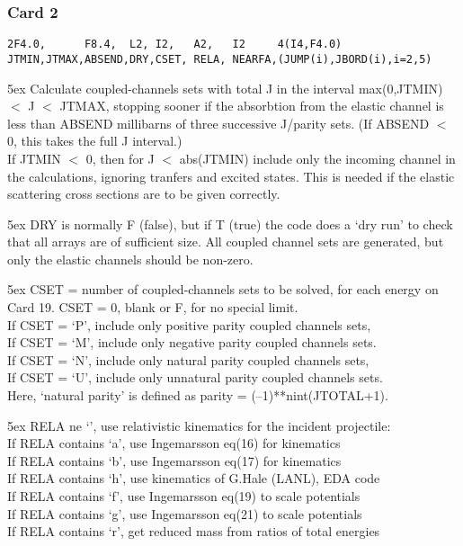 \documentclass[11pt]{article}
\begin{document}
\subsubsection*{Card 2}
\begin{verbatim}
2F4.0,      F8.4,  L2, I2,   A2,   I2     4(I4,F4.0)
JTMIN,JTMAX,ABSEND,DRY,CSET, RELA, NEARFA,(JUMP(i),JBORD(i),i=2,5)
\end{verbatim}



\hangindent 5ex
Calculate coupled-channels sets with total J in the interval
max(0,JTMIN) $<$  J  $<$ JTMAX,
stopping sooner if the absorbtion from the elastic channel
is less than ABSEND millibarns of three successive J/parity sets.
(If ABSEND $<$ 0, this takes the full J interval.)
\\
If JTMIN $<$ 0, then for J $<$ abs(JTMIN) include only the incoming channel
in the calculations, ignoring tranfers and excited states.
This is needed if the elastic scattering cross sections are to be given
correctly.

\hangindent 5ex
DRY is normally F (false), but if T (true) the code does a `dry run'
to check that all arrays are of sufficient size.
All coupled channel sets are generated, but only the elastic
channels should be non-zero.

\hangindent 5ex
CSET = number of coupled-channels sets to be solved, for each energy
on Card 19.  CSET = 0, blank or F, for no special limit.\\
If CSET = `P', include only positive parity coupled channels sets,\\
If CSET = `M', include only negative parity coupled channels sets.\\
If CSET = `N', include only natural parity coupled channels sets,\\
If CSET = `U', include only unnatural parity coupled channels sets.\\
Here, `natural parity' is defined as parity = (--1)**nint(JTOTAL+1).

\hangindent 5ex
RELA ne `', use relativistic kinematics for the incident projectile:\\
If RELA contains `a', use Ingemarsson eq(16) for kinematics\\
If RELA contains `b', use Ingemarsson eq(17) for kinematics\\
If RELA contains `h', use kinematics of G.Hale (LANL), EDA code\\
If RELA contains `f', use Ingemarsson eq(19) to scale potentials\\
If RELA contains `g', use Ingemarsson eq(21) to scale potentials\\
If RELA contains `r', get reduced mass from ratios of total energies
\end{document}

